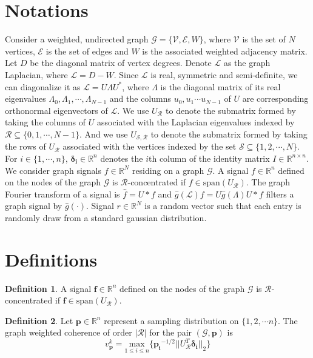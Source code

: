 \documentclass[a4paper]{article}
\newcommand{\R}{\mathcal{R}}
\newcommand{\RR}{\mathbb{R}}
\newcommand{\N}{\mathbb{N}}
\newcommand{\G}{\mathcal{G}}
\newcommand{\V}{\mathcal{V}}
\newcommand{\E}{\mathcal{E}}
\renewcommand{\L}{\boldsymbol{\mathcal{L}}}
\newcommand{\UR}{U_{\mathcal{R}}}
\newcommand{\vv}{\mathit{v}}
\theoremstyle{definition}
\newtheorem*{definition}{Definition}
\begin{document}
\section{Notations}
Consider a weighted, undirected graph $\G = \{ \V, \E, W\}$, where $\V$ is the set of $N$ vertices, $\E$ is the set of edges and $W$ is the associated weighted adjacency matrix. Let $D$ be the diagonal matrix of vertex degrees. Denote $\L$ as the graph Laplacian, where $\L = D-W$. Since $\L$ is real, symmetric and semi-definite, we can diagonalize it as $\L =U\Lambda U^*$, where $\Lambda$ is the diagonal matrix of its real eigenvalues $\Lambda_0, \Lambda_1,\cdots, \Lambda_{N-1}$ and the columns $u_0, u_1 \cdots u_{N-1}$ of $U$ are corresponding orthonormal eigenvectors of $\L$. We use $\UR$ to denote the submatrix formed by taking the columns of $U$ associated with the Laplacian eigenvalues indexed by $\mathcal{R} \subseteq \{0,1,\cdots,N-1\}$. And we use $U_{\mathcal{S},\mathcal{R}}$ to denote the submatrix formed by taking the rows of $U_{\mathcal{R}}$ associated with the vertices indexed by the set $\mathcal{S} \subseteq \{1,2,\cdots, N\}$. For $i \in \{1,\cdots,n\}$, $\bm{\delta_i} \in \RR^n$ denotes the $i$th column of the identity matrix $I \in \RR^{n\times n}.$
We consider graph signals $f \in \RR^N$ residing on a graph $\G$. A signal $f \in \RR^n$ defined on the nodes of the graph $\G$ is $\R$-concentrated if $f \in \text{span}(U_{\R})$. The graph Fourier transform of a signal is $\hat{f} = U*f$ and $\hat{g}(\L) f = U\hat{g}(\Lambda)U*f$ filters a graph signal by $\hat{g}(\cdot)$. Signal $r\in \RR^N$ is a random vector such that each entry is randomly draw from a standard gaussian distribution.

\medskip

\section{Definitions}

\begin{definition}
A signal $\bm{f} \in \RR^n$ defined on the nodes of the graph $\G$ is $\R$-concentrated if $\bm{f} \in \text{span}(U_{\R})$.
\end{definition}

\begin{definition}
Let $\bm{p} \in \RR^{n}$ represent a sampling distribution on $\{1,2,\cdots n\}$. The graph weighted coherence of order $|\R| $ for the pair $(\G, \bm{p})$ is
$$ \vv^k_{\bm{p}} = \underset{1\leq i\leq n}{\text{ max }} \{\bm{p_i}^{-1/2} ||U_{\R}^T \bm{\delta_i} ||_2\}$$

\end{definition}
\end{document}
